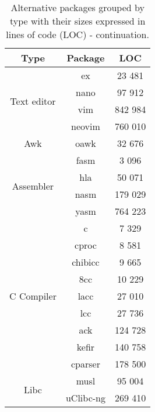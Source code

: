 \begin{table}[!ht]
    \centering
    \begin{tabular}{|c|c|c|}
        \hline
        Type & Package & LOC \\
        \hline
        \hline
        \multirow{4}{*}{Text editor}
        & ex \cite{ex-vi} \footnotemark & 23 481 \\
        \cline{2-3}
        & nano \cite{nano} & 97 912 \\
        \cline{2-3}
        & vim \cite{vim} & 842 984 \\
        \cline{2-3}
        & neovim \cite{neovim} & 760 010 \\
        \hline
        \hline
        Awk & oawk \cite{oawk} & 32 676 \\
        \hline
        \hline
        \multirow{4}{*}{Assembler}
        & fasm \cite{fasm} & 3 096 \\
        \cline{2-3}
        & hla \cite{hla} & 50 071 \\
        \cline{2-3}
        & nasm \cite{nasm} & 179 029 \\
        \cline{2-3}
        & yasm \cite{yasm} & 764 223 \\
        \hline
        \hline
        \multirow{9}{*}{C Compiler}
        & c \cite{c} & 7 329 \\
        \cline{2-3}
        & cproc \cite{cproc} & 8 581 \\
        \cline{2-3}
        & chibicc \cite{chibicc} & 9 665 \\
        \cline{2-3}
        & 8cc \cite{8cc} & 10 229 \\
        \cline{2-3}
        & lacc \cite{lacc} & 27 010 \\
        \cline{2-3}
        & lcc \cite{lcc} \footnotemark & 27 736 \\
        \cline{2-3}
        & ack \cite{ack} & 124 728 \\
        \cline{2-3}
        & kefir \cite{kefir} & 140 758 \\
        \cline{2-3}
        & cparser \cite{cparser} & 178 500 \\
        \hline
        \hline
        \multirow{2}{*}{Libc}
        & musl \cite{musl} & 95 004 \\
        \cline{2-3}
        & uClibc-ng \cite{uclibc-ng} & 269 410 \\
        \hline
    \end{tabular}
    \caption{Alternative packages grouped by type with their sizes expressed in lines of code (LOC) - continuation.}
\end{table}


\newpage
